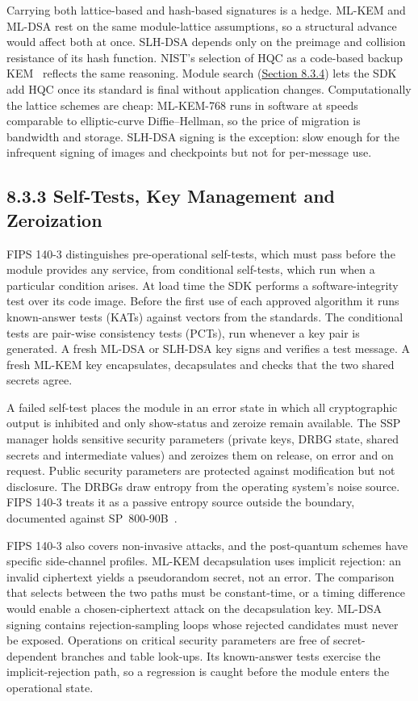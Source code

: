 \documentclass{report}
\theoremstyle{plain}
\theoremstyle{definition}
\theoremstyle{remark}
\begin{document}
Carrying both lattice-based and hash-based signatures is a hedge. ML-KEM and ML-DSA rest on the same module-lattice assumptions, so a structural advance would affect both at once. SLH-DSA depends only on the preimage and collision resistance of its hash function. NIST's selection of HQC as a code-based backup KEM~\cite{nist2025ir8545} reflects the same reasoning. Module search (\hyperref[sec:pqc:search]{Section 8.3.4}) lets the SDK add HQC once its standard is final without application changes. Computationally the lattice schemes are cheap: ML-KEM-768 runs in software at speeds comparable to elliptic-curve Diffie--Hellman, so the price of migration is bandwidth and storage. SLH-DSA signing is the exception: slow enough for the infrequent signing of images and checkpoints but not for per-message use.

\subsection{8.3.3 Self-Tests, Key Management and Zeroization}\label{sec:pqc:selftests}

FIPS 140-3 distinguishes pre-operational self-tests, which must pass before the module provides any service, from conditional self-tests, which run when a particular condition arises. At load time the SDK performs a software-integrity test over its code image. Before the first use of each approved algorithm it runs known-answer tests (KATs) against vectors from the standards. The conditional tests are pair-wise consistency tests (PCTs), run whenever a key pair is generated. A fresh ML-DSA or SLH-DSA key signs and verifies a test message. A fresh ML-KEM key encapsulates, decapsulates and checks that the two shared secrets agree.

A failed self-test places the module in an error state in which all cryptographic output is inhibited and only show-status and zeroize remain available. The SSP manager holds sensitive security parameters (private keys, DRBG state, shared secrets and intermediate values) and zeroizes them on release, on error and on request. Public security parameters are protected against modification but not disclosure. The DRBGs draw entropy from the operating system's noise source. FIPS 140-3 treats it as a passive entropy source outside the boundary, documented against SP~800-90B~\cite{nist2018sp80090b}.

FIPS 140-3 also covers non-invasive attacks, and the post-quantum schemes have specific side-channel profiles. ML-KEM decapsulation uses implicit rejection: an invalid ciphertext yields a pseudorandom secret, not an error. The comparison that selects between the two paths must be constant-time, or a timing difference would enable a chosen-ciphertext attack on the decapsulation key. ML-DSA signing contains rejection-sampling loops whose rejected candidates must never be exposed. Operations on critical security parameters are free of secret-dependent branches and table look-ups. Its known-answer tests exercise the implicit-rejection path, so a regression is caught before the module enters the operational state.
\end{document}
